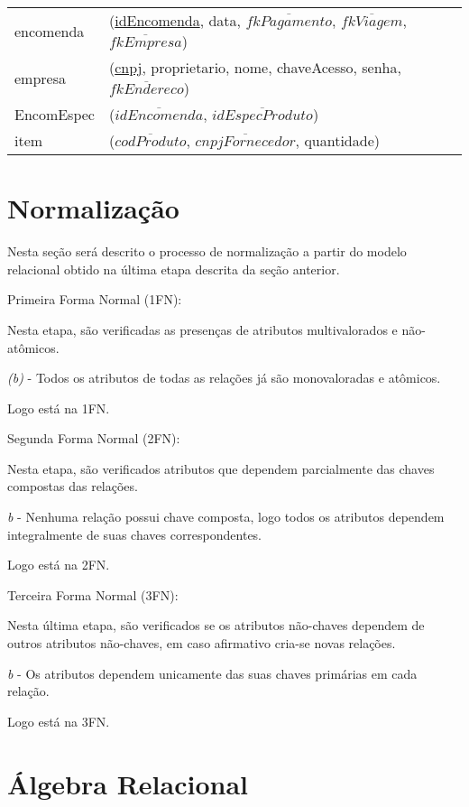 \documentclass[12pt, onecolumn, titlepage]{article}
\begin{document}
\begin{table}[htb!]
\begin{center}
\begin{tabular}{p{2.5cm} p{10.5cm}}
encomenda & (\underline{idEncomenda}, data, $\overline{fkPagamento}$, $\overline{fkViagem}$, $\overline{fkEmpresa}$)\\
empresa & (\underline{cnpj}, proprietario, nome, chaveAcesso, senha, $\overline{fkEndereco}$)\\
EncomEspec & (\underline{$\overline{idEncomenda}$}, \underline{$\overline{idEspecProduto}$})\\
item & (\underline{$\overline{codProduto}$}, \underline{$\overline{cnpjFornecedor}$}, quantidade)
\end{tabular}
\end{center}
\end{table}

\newpage
\section{Normalização}
Nesta seção será descrito o processo de normalização a partir do modelo relacional obtido na última etapa descrita da seção anterior.

\begin{description}

\item Primeira Forma Normal (1FN):

Nesta etapa, são verificadas as presenças de atributos multivalorados e não-atômicos.

\textit{(b)} - Todos os atributos de todas as relações já são monovaloradas e atômicos.

Logo está na 1FN.

\item Segunda Forma Normal (2FN):

Nesta etapa, são verificados atributos que dependem parcialmente das chaves compostas das relações.

\textit{b} - Nenhuma relação possui chave composta, logo todos os atributos dependem integralmente de suas chaves correspondentes.

Logo está na 2FN.

\item Terceira Forma Normal (3FN):

Nesta última etapa, são verificados se os atributos não-chaves dependem de outros atributos não-chaves, em caso afirmativo cria-se novas relações.

\textit{b} - Os atributos dependem unicamente das suas chaves primárias em cada relação.

Logo está na 3FN.
\end{description}


\section{Álgebra Relacional}
\label{sect:algebra}
\end{document}
